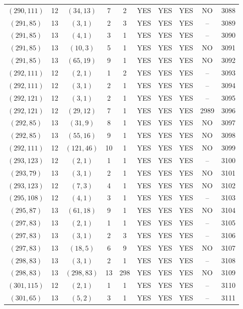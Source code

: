\begin{longtable}{|c|c|c|c|c|c|c|c|c|c|}
$(290, 111)$ & 12 & $(34, 13)$ & 7 & 2 & YES & YES & YES & NO & 3088\\
$(291, 85)$ & 13 & $(3, 1)$ & 2 & 3 & YES & YES & YES & -- & 3089\\
$(291, 85)$ & 13 & $(4, 1)$ & 3 & 1 & YES & YES & YES & -- & 3090\\
$(291, 85)$ & 13 & $(10, 3)$ & 5 & 1 & YES & YES & YES & NO & 3091\\
$(291, 85)$ & 13 & $(65, 19)$ & 9 & 1 & YES & YES & YES & NO & 3092\\
$(292, 111)$ & 12 & $(2, 1)$ & 1 & 2 & YES & YES & YES & -- & 3093\\
$(292, 111)$ & 12 & $(3, 1)$ & 2 & 1 & YES & YES & YES & -- & 3094\\
$(292, 121)$ & 12 & $(3, 1)$ & 2 & 1 & YES & YES & YES & -- & 3095\\
$(292, 121)$ & 12 & $(29, 12)$ & 7 & 1 & YES & YES & YES & 2989 & 3096\\
$(292, 85)$ & 13 & $(31, 9)$ & 8 & 1 & YES & YES & YES & NO & 3097\\
$(292, 85)$ & 13 & $(55, 16)$ & 9 & 1 & YES & YES & YES & NO & 3098\\
$(292, 111)$ & 12 & $(121, 46)$ & 10 & 1 & YES & YES & YES & NO & 3099\\
$(293, 123)$ & 12 & $(2, 1)$ & 1 & 1 & YES & YES & YES & -- & 3100\\
$(293, 79)$ & 13 & $(3, 1)$ & 2 & 1 & YES & YES & YES & NO & 3101\\
$(293, 123)$ & 12 & $(7, 3)$ & 4 & 1 & YES & YES & YES & NO & 3102\\
$(295, 108)$ & 12 & $(4, 1)$ & 3 & 1 & YES & YES & YES & -- & 3103\\
$(295, 87)$ & 13 & $(61, 18)$ & 9 & 1 & YES & YES & YES & NO & 3104\\
$(297, 83)$ & 13 & $(2, 1)$ & 1 & 1 & YES & YES & YES & -- & 3105\\
$(297, 83)$ & 13 & $(3, 1)$ & 2 & 3 & YES & YES & YES & -- & 3106\\
$(297, 83)$ & 13 & $(18, 5)$ & 6 & 9 & YES & YES & YES & NO & 3107\\
$(298, 83)$ & 13 & $(3, 1)$ & 2 & 1 & YES & YES & YES & -- & 3108\\
$(298, 83)$ & 13 & $(298, 83)$ & 13 & 298 & YES & YES & YES & NO & 3109\\
$(301, 115)$ & 12 & $(2, 1)$ & 1 & 1 & YES & YES & YES & -- & 3110\\
$(301, 65)$ & 13 & $(5, 2)$ & 3 & 1 & YES & YES & YES & -- & 3111\\

\end{longtable}
